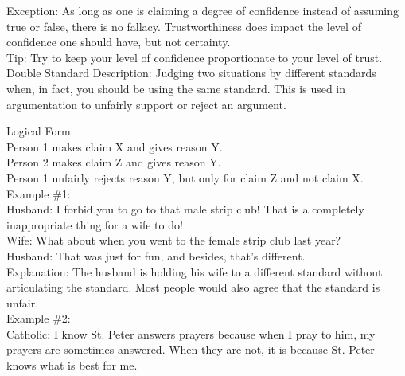 \documentclass[a4paper,12pt,single,pdftex]{scrartcl}
\begin{document}
    
      Exception: As long as one is claiming a degree of confidence instead of assuming true or false, there is no fallacy. Trustworthiness does impact the level of confidence one should have, but not certainty.
    \\

    
      Tip: Try to keep your level of confidence proportionate to your level of trust.
    \\

  

Double Standard
    Description: Judging two situations by different standards when, in fact, you should be using the same standard. This is used in argumentation to unfairly support or reject an argument.

    
      Logical Form:
    \\

    
      Person 1 makes claim X and gives reason Y.
    \\

    
      Person 2 makes claim Z and gives reason Y.
    \\

    
      Person 1 unfairly rejects reason Y, but only for claim Z and not claim X.
    \\

    
      Example \#1:
    \\

    
      Husband: I forbid you to go to that male strip club! That is a completely inappropriate thing for a wife to do!
    \\

    
      Wife: What about when you went to the female strip club last year?
    \\

    
      Husband: That was just for fun, and besides, that's different.
    \\

    
      Explanation: The husband is holding his wife to a different standard without articulating the standard. Most people would also agree that the standard is unfair.
    \\

    
      Example \#2:
    \\

    
      Catholic: I know St. Peter answers prayers because when I pray to him, my prayers are sometimes answered. When they are not, it is because St. Peter knows what is best for me.
    \\
\end{document}
